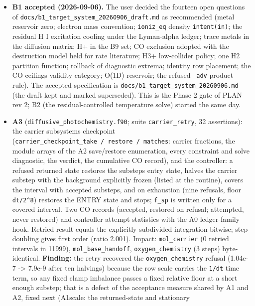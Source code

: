 \documentclass[english,a4paper]{my_memo}
\begin{document}
\begin{itemize}
  unusable. Tolerances inherited; the convergence study is owed.
\item
  \textbf{B1 accepted (2026-09-06).} The user decided the fourteen open
  questions of \texttt{docs/b1\_target\_system\_20260906\_draft.md} as recommended
  (metal reservoir zero; electron mass convention; \texttt{ioniz\_eq} density
  \texttt{intent(in)}; the residual H I excitation cooling under the Lyman-alpha
  ledger; trace metals in the diffusion matrix; H+ in the B9 set; CO
  exclusion adopted with the destruction model held for rate literature;
  H3+ low-collider policy; one H2 partition function; rollback of
  diagnostic extrema; identity row placement; the CO ceiling\textquotesingle s validity
  category; O(1D) reservoir; the refused \texttt{\_adv} product rule). The accepted
  specification is \texttt{docs/b1\_target\_system\_20260906.md} (the draft kept and
  marked superseded). This is the Phase 2 gate of PLAN rev 2; B2 (the
  residual-controlled temperature solve) started the same day.
\item
  \textbf{A3} (\texttt{diffusive\_photochemistry.f90}; suite \texttt{carrier\_retry}, 32
  assertions): the carrier subsystem\textquotesingle s checkpoint (\texttt{carrier\_checkpoint\_take\ /\ restore\ /\ matches}: carrier fractions, the module arrays of the A2
  save/restore enumeration, every constraint and solve diagnostic, the
  verdict, the cumulative CO record), and the controller: a refused
  returned state restores the substep\textquotesingle s entry state, halves the carrier
  substep with the background explicitly frozen (listed at the routine),
  covers the interval with accepted substeps, and on exhaustion (nine
  refusals, floor \texttt{dt/2\^{}8}) restores the ENTRY state and stops; \texttt{f\_sp} is
  written only for a covered interval. Two CO records (accepted, restored
  on refusal; attempted, never restored) and controller attempt statistics
  with the A0 ledger-family hook. Retried result equals the explicitly
  subdivided integration bitwise; step doubling gives first order (ratio
  2.001). Impact: \texttt{mol\_carrier} (0 retried intervals in 11999),
  \texttt{mol\_base\_handoff}, \texttt{oxygen\_chemistry} (3 steps) byte-identical.
  \textbf{Finding:} the retry recovered the \texttt{oxygen\_chemistry} refusal (1.04e-7
  -\textgreater{} 7.9e-9 after ten halvings) because the row scale carries the \texttt{1/dt}
  time term, so any fixed clamp imbalance passes a fixed relative floor at
  a short enough substep; that is a defect of the acceptance measure shared
  by A1 and A2, fixed next (A1scale: the returned-state and stationary

\end{itemize}
\end{document}
